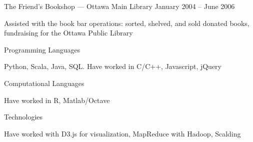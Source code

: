 \documentclass[11pt,article,oneside]{memoir}
\begin{document}
 \bigskip

\medskip

\vspace{0.05in}

\ind The Friend's Bookshop --- Ottawa Main Library \hfill  January 2004 -- June 2006

\ind \hspace{0.35in}  Assisted with the book bar operations: sorted, shelved, and sold donated books, fundraising for the Ottawa Public Library

\bigskip

\medskip

\vspace{0.05in}

\ind Programming Languages

\ind \hspace{0.35in} Python, Scala, Java, SQL. Have worked in C/C++, Javascript, jQuery

\ind Computational Languages

\ind \hspace{0.35in} Have worked in R, Matlab/Octave

\ind Technologies

\ind \hspace{0.35in} Have worked with D3.js for visualization, MapReduce with Hadoop, Scalding
\end{document}
